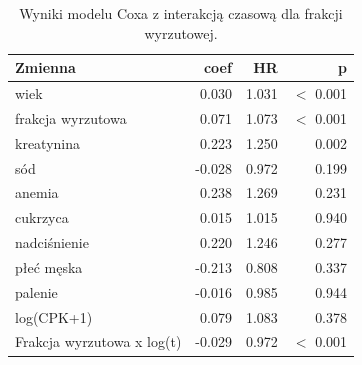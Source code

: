 \begin{table}[htbp]
\centering
\caption{Wyniki modelu Coxa z interakcją czasową dla frakcji wyrzutowej.}
\label{tab:cox-time-results}
\scriptsize
\setlength{\tabcolsep}{1.5pt}
\begin{tabular}{lrrr}
\toprule
Zmienna & coef & HR & p \\
\midrule
wiek & 0.030 & 1.031 & $<$ 0.001 \\
frakcja wyrzutowa & 0.071 & 1.073 & $<$ 0.001 \\
kreatynina & 0.223 & 1.250 & 0.002 \\
sód & -0.028 & 0.972 & 0.199 \\
anemia & 0.238 & 1.269 & 0.231 \\
cukrzyca & 0.015 & 1.015 & 0.940 \\
nadciśnienie & 0.220 & 1.246 & 0.277 \\
płeć męska & -0.213 & 0.808 & 0.337 \\
palenie & -0.016 & 0.985 & 0.944 \\
log(CPK+1) & 0.079 & 1.083 & 0.378 \\
Frakcja wyrzutowa x log(t) & -0.029 & 0.972 & $<$ 0.001 \\
\bottomrule
\end{tabular}
\end{table}
